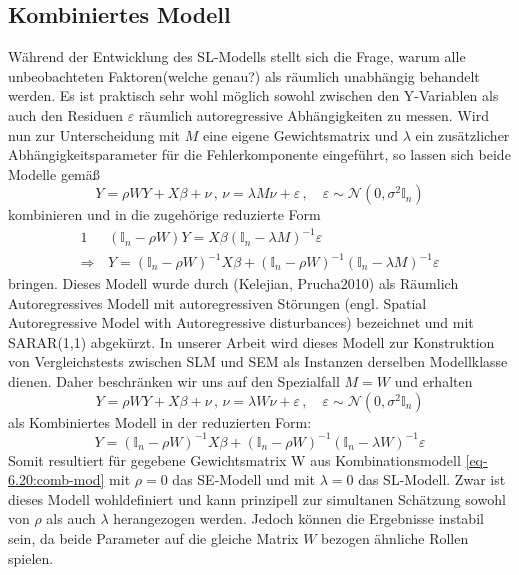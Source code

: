 \subsection{Kombiniertes Modell}
Während der Entwicklung des SL-Modells stellt sich die Frage, warum alle unbeobachteten Faktoren(welche genau?) 
als räumlich unabhängig behandelt werden. Es ist praktisch sehr wohl möglich sowohl zwischen den Y-Variablen 
als auch den Residuen $\varepsilon$ räumlich autoregressive Abhängigkeiten zu messen. Wird nun zur Unterscheidung 
mit $M$ eine eigene Gewichtsmatrix und $\lambda$ ein zusätzlicher Abhängigkeitsparameter für die Fehlerkomponente 
eingeführt, so lassen sich beide Modelle gemäß
\begin{equation*}
    Y=\rho W Y + X \beta + \nu \, , \, \nu=\lambda M \nu + \varepsilon \, , \quad 
    \varepsilon \sim \mathcal{N}(0,\sigma^{2} \mathds{I}_{n})
\end{equation*}
kombinieren und in die zugehörige reduzierte Form
\begin{alignat*}{1}
    &(\mathds{I}_{n} - \rho W) Y = X \beta (\mathds{I}_{n} - \lambda M)^{-1} \varepsilon \\
    \Rightarrow \, & Y=(\mathds{I}_{n}-\rho W)^{-1} X \beta + 
    (\mathds{I}_{n}-\rho W)^{-1}(\mathds{I}_{n}-\lambda M)^{-1} \varepsilon
\end{alignat*}
bringen. Dieses Modell wurde durch (Kelejian, Prucha2010) als Räumlich Autoregressives Modell mit 
autoregressiven Störungen
(engl. Spatial Autoregressive Model with Autoregressive disturbances) bezeichnet und mit SARAR(1,1) abgekürzt.
In unserer Arbeit wird dieses Modell zur Konstruktion von Vergleichstests 
zwischen SLM und SEM als Instanzen derselben Modellklasse dienen. Daher beschränken wir uns auf 
den Spezialfall $M=W$ und erhalten
\begin{equation} \label{eq-6.20:comb-mod}
    Y=\rho W Y + X \beta + \nu \, , \, \nu=\lambda W \nu + \varepsilon \, , \quad 
    \varepsilon \sim \mathcal{N}(0,\sigma^{2} \mathds{I}_{n})
\end{equation}
als Kombiniertes Modell in der reduzierten Form: 
\begin{equation*}
    Y=(\mathds{I}_{n}-\rho W)^{-1} X \beta + (\mathds{I}_{n}-\rho W)^{-1}(\mathds{I}_{n}-\lambda W)^{-1} \varepsilon
\end{equation*}
Somit resultiert für gegebene Gewichtsmatrix W aus Kombinationsmodell \eqref{eq-6.20:comb-mod} 
mit $\rho=0$ das SE-Modell und mit $\lambda=0$ das SL-Modell. Zwar ist dieses Modell wohldefiniert und kann 
prinzipell zur simultanen Schätzung sowohl von $\rho$ als auch $\lambda$ herangezogen werden. 
Jedoch können die Ergebnisse instabil sein, da beide Parameter auf die gleiche Matrix $W$ bezogen 
ähnliche Rollen spielen.

